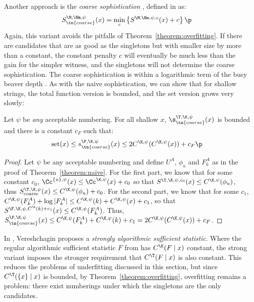 Another approach is the \emph{coarse sophistication} \cite{antunes2009sophistication}, defined in \cite{mota2013sophistication} as:
\[
S^{\M,\Nm,\psi}_\tn{coarse}(x) = \min_c\left\{S^{\M,\Nm,\psi,c}(x) + c \right\} \p
\]
Again, this variant avoids the pitfalls of Theorem~\ref{theorem:overfitting}. If there are candidates that are as good as the singletons but with smaller size by more than a constant, the constant penalty $c$ will eventually be much less than the gain for the simpler witness, and the singletons will not determine the coarse sophistication. The coarse sophistication is within a logarithmic term of the busy beaver depth \cite{antunes2009sophistication}. As with the naive sophistication, we can show that for shallow strings, the total function version is bounded, and the set version grows very slowly:
\begin{theorem}
Let $\psi$ be \emph{any} acceptable numbering. For all shallow $x$, $\s_\tn{coarse}^{\T,\K,\psi}(x)$ is bounded and there is a constant $c_F$ such that:\belowdisplayskip=-12pt
\[
\text{set}(x) \leq s_\tn{coarse}^{\F,\K,\psi}(x) \leq 2 C^{\K,\psi}(C^{\K,\psi}(x)) + c_F \p
\]\label{theorem:coarse}
\end{theorem}
\begin{proof}
Let $\psi$ be any acceptable numbering and define $U^A$, $\phi_u$ and $F^A_k$ as in the proof of Theorem~\ref{theorem:naive}. For the first part, we know that for some constant $c_0$, $\Cc^{\{u\}, \psi}(x) \leq \Cc^{\K,\psi}(x) + c_0$ so that $S^{\T, \K,\psi,c_0}(x) \leq C^{\K,\psi}(\phi_u)$, thus $S_\text{coarse}^{\T,\K,\psi}(x) \leq C^{\K,\psi}(\phi_u) + c_0$. For the second part, we know that for some $c_1$, $C^{\K,\psi}(F^A_k) + \log|F^A_k| \leq C^{\K,\psi}(k) + C^{\K,\psi}(x)+ c_1$, so that $S^{\F,\K,\psi,C^\K(k)+c_1}(x) \leq C^{\K,\psi}(F^A_k)$. Thus, $S_\tn{coarse}^{\F,\K,\psi}(x) \leq C^{\K,\psi}(F^A_k) + C^{\K,\psi}(k) + c_1 = 2 C^{\K,\psi}(C^{\K,\psi}(x)) + c_F$.
\end{proof}
In \cite{vereshchagin2013algorithmic}, Vereshchagin proposes a \emph{strongly algorithmic sufficient statistic}. Where the regular algorithmic sufficient statistic $F$ from \cite{gacs2001algorithmic} has $C^\K(F\mid x)$ constant, the strong variant imposes the stronger requirement that $C^\T(F\mid x)$ is also constant. This reduces the problems of underfitting discussed in this section, but since $C^\T(\{x\}\mid x)$ is bounded, by Theorem~\ref{theorem:overfitting}, overfitting remains a problem: there exist numberings under which the singletons are the only candidates.

